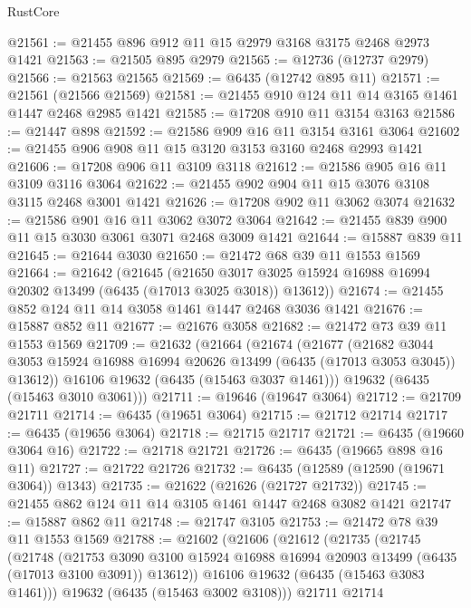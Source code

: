 \begin{lexlean}{RustCore}
\begin{coremodule}
@21561 := @21455 @896 @912 @11 @15 @2979 @3168 @3175 @2468 @2973 @1421
@21563 := @21505 @895 @2979
@21565 := @12736 (@12737 @2979)
@21566 := @21563 @21565
@21569 := @6435 (@12742 @895 @11)
@21571 := @21561 (@21566 @21569)
@21581 := @21455 @910 @124 @11 @14 @3165 @1461 @1447 @2468 @2985 @1421
@21585 := @17208 @910 @11 @3154 @3163
@21586 := @21447 @898
@21592 := @21586 @909 @16 @11 @3154 @3161 @3064
@21602 := @21455 @906 @908 @11 @15 @3120 @3153 @3160 @2468 @2993 @1421
@21606 := @17208 @906 @11 @3109 @3118
@21612 := @21586 @905 @16 @11 @3109 @3116 @3064
@21622 := @21455 @902 @904 @11 @15 @3076 @3108 @3115 @2468 @3001 @1421
@21626 := @17208 @902 @11 @3062 @3074
@21632 := @21586 @901 @16 @11 @3062 @3072 @3064
@21642 := @21455 @839 @900 @11 @15 @3030 @3061 @3071 @2468 @3009 @1421
@21644 := @15887 @839 @11
@21645 := @21644 @3030
@21650 := @21472 @68 @39 @11 @1553 @1569
@21664 := @21642
    (@21645
      (@21650 @3017 @3025 @15924 @16988 @16994 @20302 @13499 (@6435 (@17013 @3025 @3018)) @13612))
@21674 := @21455 @852 @124 @11 @14 @3058 @1461 @1447 @2468 @3036 @1421
@21676 := @15887 @852 @11
@21677 := @21676 @3058
@21682 := @21472 @73 @39 @11 @1553 @1569
@21709 := @21632
    (@21664
      (@21674
        (@21677
          (@21682
            @3044
            @3053
            @15924
            @16988
            @16994
            @20626
            @13499
            (@6435 (@17013 @3053 @3045))
            @13612))
        @16106
        @19632
        (@6435 (@15463 @3037 @1461)))
      @19632
      (@6435 (@15463 @3010 @3061)))
@21711 := @19646 (@19647 @3064)
@21712 := @21709 @21711
@21714 := @6435 (@19651 @3064)
@21715 := @21712 @21714
@21717 := @6435 (@19656 @3064)
@21718 := @21715 @21717
@21721 := @6435 (@19660 @3064 @16)
@21722 := @21718 @21721
@21726 := @6435 (@19665 @898 @16 @11)
@21727 := @21722 @21726
@21732 := @6435 (@12589 (@12590 (@19671 @3064)) @1343)
@21735 := @21622 (@21626 (@21727 @21732))
@21745 := @21455 @862 @124 @11 @14 @3105 @1461 @1447 @2468 @3082 @1421
@21747 := @15887 @862 @11
@21748 := @21747 @3105
@21753 := @21472 @78 @39 @11 @1553 @1569
@21788 := @21602
    (@21606
      (@21612
        (@21735
          (@21745
            (@21748
              (@21753
                @3090
                @3100
                @15924
                @16988
                @16994
                @20903
                @13499
                (@6435 (@17013 @3100 @3091))
                @13612))
            @16106
            @19632
            (@6435 (@15463 @3083 @1461)))
          @19632
          (@6435 (@15463 @3002 @3108)))
        @21711
        @21714

\end{coremodule}
\end{lexlean}
